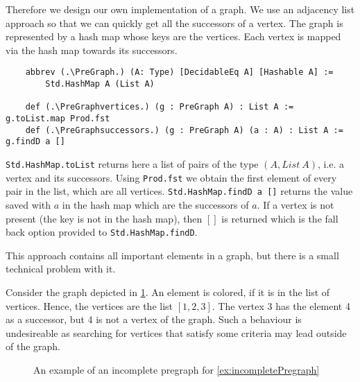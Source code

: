 Therefore we design our own implementation of a graph. We use an adjacency list approach so that we can quickly get all the successors of a vertex. The graph is represented by a hash map whose keys are the vertices. Each vertex is mapped via the hash map towards its successors.

\begin{lstlisting}
    abbrev (.\PreGraph.) (A: Type) [DecidableEq A] [Hashable A] := 
        Std.HashMap A (List A)

    def (.\PreGraphvertices.) (g : PreGraph A) : List A := g.toList.map Prod.fst
    def (.\PreGraphsuccessors.) (g : PreGraph A) (a : A) : List A := g.findD a []
\end{lstlisting}

\lstinline|Std.HashMap.toList| returns here a list of pairs of the type $(A, List\ A)$, i.e. a vertex and its successors. Using \lstinline|Prod.fst| we obtain the first element of every pair in the list, which are all vertices. \lstinline|Std.HashMap.findD a []| returns the value saved with $a$ in the hash map which are the successors of $a$. If a vertex is not present (the key is not in the hash map), then $[]$ is returned which is the fall back option provided to  \lstinline|Std.HashMap.findD|.

This approach contains all important elements in a graph, but there is a small technical problem with it. 

\begin{example}\label{ex:incompletePregraph}
    
    Consider the graph depicted in \cref{ex:counterexampleGraph}. An element is colored, if it is in the list of vertices. Hence, the vertices are the list $[1,2,3]$. The vertex 3 has the element 4 as a successor, but 4 is not a vertex of the graph. Such a behaviour is undesireable as searching for vertices that satisfy some criteria may lead outside of the graph.

\begin{figure}
    \centering
    \caption{An example of an incomplete pregraph for \cref{ex:incompletePregraph}}      
    \label{ex:counterexampleGraph}

\end{figure}
    
\end{example}

